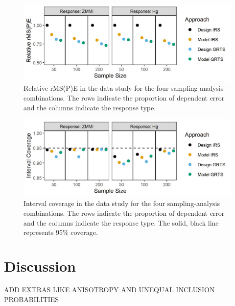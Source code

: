 \documentclass[]{elsarticle} %
\begin{document}
\begin{figure}
  \centering
  \includegraphics[width = 1\linewidth]{figures/data_rmspe_eff.jpeg}
  \caption{Relative rMS(P)E in the data study for the four sampling-analysis combinations. The rows indicate the proportion of dependent error and the columns indicate the response type.}
  \label{fig:data_rmspe_eff}
\end{figure}

\begin{figure}
  \centering
  \includegraphics[width = 1\linewidth]{figures/data_coverage.jpeg}
  \caption{Interval coverage in the data study for the four sampling-analysis combinations. The rows indicate the proportion of dependent error and the columns indicate the response type. The solid, black line represents 95\% coverage.}
  \label{fig:data_figconf}
\end{figure}

\hypertarget{sec:discussion}{%
\section{Discussion}\label{sec:discussion}}

ADD EXTRAS LIKE ANISOTROPY AND UNEQUAL INCLUSION PROBABILITIES
\end{document}
